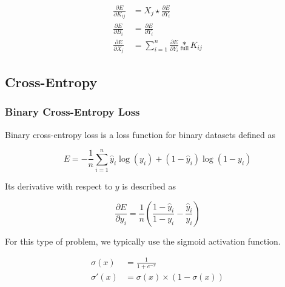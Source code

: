 \documentclass{article}
\begin{document}
\begin{align}
	\displaystyle\frac{\partial E}{\partial K_{ij}} &= X_j \star \displaystyle\frac{\partial E}{\partial Y_i} \\
	\displaystyle\frac{\partial E}{\partial B_i} &= \displaystyle\frac{\partial E}{\partial Y_i} \\
	\displaystyle\frac{\partial E}{\partial X_j} &= \displaystyle\sum_{i=1}^{n}
	\displaystyle\frac{\partial E}{\partial Y_i} \underset{\text{full}}{*} K_{ij}
	\label{eq:kernelbackpropagation}
\end{align}

\pagebreak

\subsection{Cross-Entropy}

\subsubsection{Binary Cross-Entropy Loss}
Binary cross-entropy loss is a loss function for binary datasets defined as

\begin{equation}
	E=-\frac{1}{n}\displaystyle\sum_{i=1}^{n}\hat y_i\log(y_i)+(1-\hat y_i)\log(1-y_i)
	\label{eq:binarycrossentropyloss}
\end{equation}

\noindent Its derivative with respect to $y$ is described as

\begin{equation}
	\displaystyle\frac{\partial E}{\partial y_i}=\frac{1}{n}\left(\displaystyle\frac{1-\hat y_i}{1-y_i}-\displaystyle\frac{\hat y_i}{y_i}\right)
	\label{eq:binarycrossentropylossprime}
\end{equation}

\noindent For this type of problem, we typically use the sigmoid activation function.

\begin{align}
	\sigma(x) &= \frac{1}{1+e^{-x}} \\
	\sigma'(x) &= \sigma(x) \times (1-\sigma(x))
\end{align}
\end{document}
